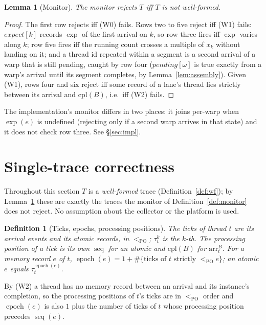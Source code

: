 \documentclass[11pt]{article}
\newtheorem{lemma}[theorem]{Lemma}
\newtheorem{definition}[theorem]{Definition}
\theoremstyle{remark}
\DeclareMathOperator{\seq}{seq}
\DeclareMathOperator{\epoch}{epoch}
\newcommand{\PO}{<_{\mathrm{PO}}}
\newcommand{\arr}[2]{\mathrm{arr}^{#2}_{#1}}
\newcommand{\tick}[2]{\tau^{#2}_{#1}}
\begin{document}
\begin{lemma}[Monitor]\label{lem:monitor}
The monitor rejects $T$ iff $T$ is not well-formed.
\end{lemma}
\begin{proof}
The first row rejects iff (W0) fails. Rows two to five reject iff (W1) fails:
$\mathit{expect}[k]$ records $\exp$ of the first arrival on $k$, so row three
fires iff $\exp$ varies along $k$; row five fires iff the running count
crosses a multiple of $x_k$ without landing on it; and a thread id repeated
within a segment is a second arrival of a warp that is still pending, caught
by row four ($\mathit{pending}[\omega]$ is true exactly from a warp's arrival
until its segment completes, by Lemma~\ref{lem:assembly}). Given (W1), rows
four and six reject iff some record of a lane's thread lies strictly between
its arrival and $\mathrm{cpl}(B)$, i.e.\ iff (W2) fails.
\end{proof}

The implementation's monitor differs in two places: it joins per-warp when
$\exp(e)$ is undefined (rejecting only if a second warp arrives in that
state) and it does not check row three. See \S\ref{sec:impl}.

\section{Single-trace correctness}\label{sec:single}

Throughout this section $T$ is a \emph{well-formed} trace
(Definition~\ref{def:wf}); by Lemma~\ref{lem:monitor} these are exactly the
traces the monitor of Definition~\ref{def:monitor} does not reject. No assumption about the
collector or the platform is used.

\begin{definition}[Ticks, epochs, processing positions]\label{def:epoch}
The \emph{ticks} of thread $t$ are its arrival events and its atomic records,
in $\PO$; $\tick{t}{k}$ is the $k$-th. The \emph{processing position} of a
tick is its own $\seq$ for an atomic and $\mathrm{cpl}(B)$ for
$\arr{t}{B}$. For a memory record $e$ of $t$,
$\epoch(e)=1+\#\{\text{ticks of }t\text{ strictly }\PO e\}$; an atomic $e$
equals $\tick{t}{\epoch(e)}$.
\end{definition}

By (W2) a thread has no memory record between an arrival
and its instance's completion, so the processing positions of $t$'s ticks are
in $\PO$ order and $\epoch(e)$ is also $1$ plus the number of ticks of $t$
whose processing position precedes $\seq(e)$.
\end{document}
